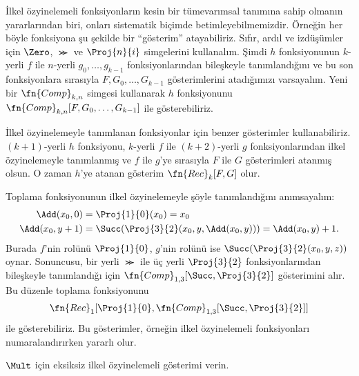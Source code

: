 


İlkel özyinelemeli fonksiyonların kesin bir tümevarımsal tanımına sahip
olmanın yararlarından biri, onları sistematik biçimde betimleyebilmemizdir.
Örneğin her böyle fonksiyona şu şekilde bir ``gösterim'' atayabiliriz. Sıfır,
ardıl ve izdüşümler için $\Zero$, $\Succ$ ve $\Proj{n}{i}$ simgelerini
kullanalım. Şimdi $h$ fonksiyonunun $k$-yerli $f$ ile $n$-yerli
$g_0,\dots,g_{k-1}$ fonksiyonlarından bileşkeyle tanımlandığını ve bu son
fonksiyonlara sırasıyla $F,G_0,\dots,G_{k-1}$ gösterimlerini atadığımızı
varsayalım. Yeni bir $\fn{Comp}_{k,n}$ simgesi kullanarak $h$ fonksiyonunu
$\fn{Comp}_{k,n}[F,G_0,\dots,G_{k-1}]$ ile gösterebiliriz.

İlkel özyinelemeyle tanımlanan fonksiyonlar için benzer gösterimler
kullanabiliriz. $(k+1)$-yerli $h$ fonksiyonu, $k$-yerli $f$ ile
$(k+2)$-yerli $g$ fonksiyonlarından ilkel özyinelemeyle tanımlanmış ve
$f$ ile $g$'ye sırasıyla $F$ ile $G$ gösterimleri atanmış olsun. O zaman
$h$'ye atanan gösterim $\fn{Rec}_k[F,G]$ olur.

Toplama fonksiyonunun ilkel özyinelemeyle şöyle tanımlandığını anımsayalım:
\begin{align*}
  \Add(x_0,0) & = \Proj{1}{0}(x_0)=x_0 \\
  \Add(x_0,y+1) & = \Succ(\Proj{3}{2}(x_0,y,\Add(x_0,y)))
    =\Add(x_0,y)+1.
\end{align*}
Burada $f$'nin rolünü $\Proj{1}{0}$, $g$'nin rolünü ise
$\Succ(\Proj{3}{2}(x_0,y,z))$ oynar. Sonuncusu, bir yerli $\Succ$ ile üç
yerli $\Proj{3}{2}$ fonksiyonlarından bileşkeyle tanımlandığı için
$\fn{Comp}_{1,3}[\Succ,\Proj{3}{2}]$ gösterimini alır. Bu düzenle toplama
fonksiyonunu
\[
  \fn{Rec}_1[\Proj{1}{0},\fn{Comp}_{1,3}[\Succ,\Proj{3}{2}]]
\]
ile gösterebiliriz. Bu gösterimler, örneğin ilkel özyinelemeli fonksiyonları
numaralandırırken yararlı olur.

\begin{prob}
  $\Mult$ için eksiksiz ilkel özyinelemeli gösterimi verin.
\end{prob}

